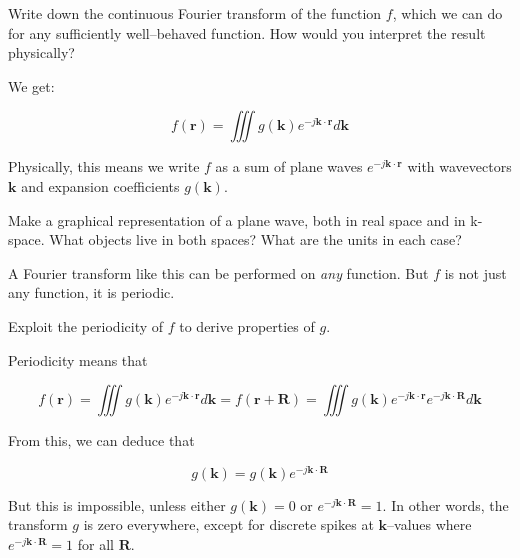\begin{cue}
  Write down the continuous Fourier transform of the function $f$, which we can do for any sufficiently well--behaved function. How would you interpret the result physically?
\end{cue}

We get:

\begin{equation}
f({\mathbf r}) = \iiint g({\mathbf k}) e ^ {-j {\mathbf k} \cdot {\mathbf r}} d{\mathbf k}
\end{equation} 

Physically, this means we write $f$ as a sum of plane waves $e ^ {-j {\mathbf k} \cdot {\mathbf r}}$ with wavevectors ${\mathbf k}$ and expansion coefficients $g({\mathbf k})$.


\begin{exer}
Make a graphical representation of a plane wave, both in real space and in k-space. What objects live in both spaces? What are the units in each case?
\end{exer}

A Fourier transform like this can be performed on \emph{any} function. But $f$ is not just any function, it is periodic.

\begin{cue}
Exploit the periodicity of $f$ to derive properties of $g$. 
\end{cue}

Periodicity means that

\begin{equation}
f({\mathbf r}) = \iiint g({\mathbf k}) e ^ {-j {\mathbf k} \cdot {\mathbf r}} d{\mathbf k} = f({\mathbf r} + {\mathbf R}) = \iiint g({\mathbf k}) e ^ {-j {\mathbf k} \cdot {\mathbf r}} e ^ {-j {\mathbf k} \cdot {\mathbf R}} d{\mathbf k}
\end{equation} 

From this, we can deduce that

\begin{equation}
g({\mathbf k}) = g({\mathbf k}) e ^ {-j {\mathbf k} \cdot {\mathbf R}}
\end{equation} 

But this is impossible, unless either $g({\mathbf k}) = 0$ or $e ^ {-j {\mathbf k} \cdot {\mathbf R}} = 1$. In other words, the transform $g$ is zero everywhere, except for discrete spikes at ${\mathbf k}$--values where $e ^ {-j {\mathbf k} \cdot {\mathbf R}} = 1$ for all ${\mathbf R}$.

